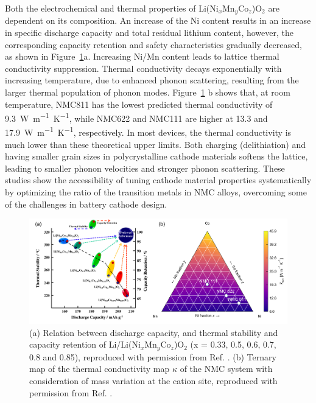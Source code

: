 \documentclass[journal=jacsat,manuscript=article]{achemso}
\begin{document}
Both the electrochemical and thermal properties of Li(Ni$_x$Mn$_y$Co$_z$)O$_2$ are dependent on its composition. 
An increase of the Ni content results in an increase in speciﬁc discharge capacity and total residual lithium content, however, the corresponding capacity retention and safety characteristics gradually decreased, as shown in Figure~\ref{figure_thermal}a.\cite{noh2013comparison} 
Increasing Ni/Mn content leads to lattice thermal conductivity suppression.\cite{yang2020chemical}
Thermal conductivity decays exponentially with increasing temperature, due to enhanced phonon scattering, resulting from the larger thermal population of phonon modes.
Figure~\ref{figure_thermal} b shows that, at room temperature, NMC811 has the lowest predicted thermal conductivity of \SI{9.3}{W.m^{-1}.K^{-1}}, while NMC622 and NMC111 are higher at 13.3 and \SI{17.9}{W.m^{-1}.K^{-1}}, respectively.
In most devices, the thermal conductivity is much lower than these theoretical upper limits.\cite{takahata2002thermal,chen2006thermal}
Both charging (delithiation) and having smaller grain sizes in polycrystalline cathode materials softens the lattice, leading to smaller phonon velocities and stronger phonon scattering.\cite{feng2020quantum,xia2020high}
These studies show the accessibility of tuning cathode material properties systematically by optimizing the ratio of the transition metals in NMC alloys, overcoming some of the challenges in battery cathode design.

\begin{figure}[]
  \centering
    \includegraphics[width=13cm]{Figures/P_thermal.png}
    \caption{(a) Relation between discharge capacity, and thermal stability and capacity retention of Li/Li(Ni$_x$Mn$_y$Co$_z$)O$_2$ (x = 0.33, 0.5, 0.6, 0.7, 0.8 and 0.85), reproduced with permission from Ref. . (b) Ternary map of the thermal conductivity map $\kappa$ of the NMC system with consideration of mass variation at the cation site, reproduced with permission from Ref. .}
  \label{figure_thermal}
\end{figure}
\end{document}
